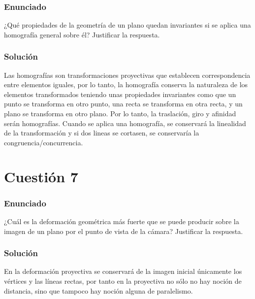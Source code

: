 \subsubsection{Enunciado}

¿Qué propiedades de la geometría de un plano quedan invariantes si se aplica una homografía general sobre él? Justificar la respuesta.

\subsubsection{Solución}

Las homografías son transformaciones proyectivas que establecen correspondencia entre elementos
iguales, por lo tanto, la homografía conserva la naturaleza de los elementos transformados teniendo unas propiedades invariantes como que un punto se transforma en otro punto, una recta se transforma en otra recta, y un plano se transforma en otro plano. Por lo tanto, la traslación, giro y afinidad serán homografías.
Cuando se aplica una homografía, se conservará la linealidad de la transformación y si dos lineas se cortasen, se conservaría la congruencia/concurrencia.


\section{Cuestión 7}

\subsubsection{Enunciado}

¿Cuál es la deformación geométrica más fuerte que se puede producir sobre la imagen de un plano por el punto de vista de la cámara? Justificar la respuesta.

\subsubsection{Solución}

En la deformación proyectiva se conservará de la imagen inicial únicamente los vértices y las líneas rectas, por tanto en la proyectiva no sólo no hay noción de distancia, sino que tampoco hay noción alguna de paralelismo.

